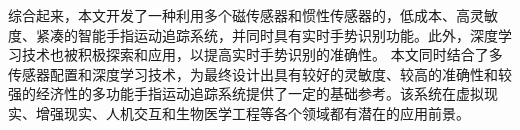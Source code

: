 综合起来，本文开发了一种利用多个磁传感器和惯性传感器的，低成本、高灵敏度、紧凑的智能手指运动追踪系统，并同时具有实时手势识别功能。此外，深度学习技术也被积极探索和应用，以提高实时手势识别的准确性。
本文同时结合了多传感器配置和深度学习技术，为最终设计出具有较好的灵敏度、较高的准确性和较强的经济性的多功能手指运动追踪系统提供了一定的基础参考。该系统在虚拟现实、增强现实、人机交互和生物医学工程等各个领域都有潜在的应用前景。